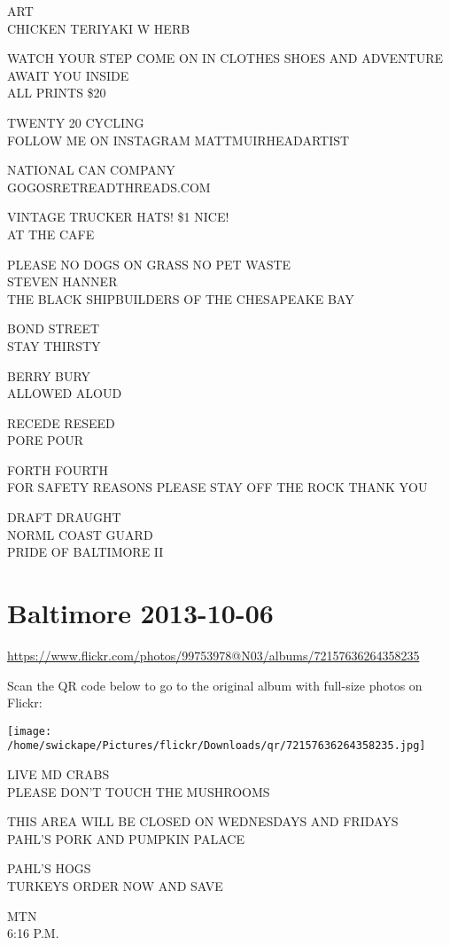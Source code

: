 \documentclass[10pt,letterpaper]{article}
\begin{document}
ART\\
CHICKEN TERIYAKI W HERB

WATCH YOUR STEP COME ON IN CLOTHES SHOES AND ADVENTURE AWAIT YOU INSIDE\\
ALL PRINTS \$20

TWENTY 20 CYCLING\\
FOLLOW ME ON INSTAGRAM MATTMUIRHEADARTIST

NATIONAL CAN COMPANY\\
GOGOSRETREADTHREADS.COM

VINTAGE TRUCKER HATS! \$1 NICE!\\
AT THE CAFE

PLEASE NO DOGS ON GRASS NO PET WASTE\\
STEVEN HANNER\\
THE BLACK SHIPBUILDERS OF THE CHESAPEAKE BAY

BOND STREET\\
STAY THIRSTY

BERRY BURY\\
ALLOWED ALOUD

RECEDE RESEED\\
PORE POUR

FORTH FOURTH\\
FOR SAFETY REASONS PLEASE STAY OFF THE ROCK THANK YOU

DRAFT DRAUGHT\\
NORML COAST GUARD\\
PRIDE OF BALTIMORE II


\section*{Baltimore 2013-10-06}

\url{https://www.flickr.com/photos/99753978@N03/albums/72157636264358235}

Scan the QR code below to go to the original album with full-size photos on Flickr:

\texttt{[image: /home/swickape/Pictures/flickr/Downloads/qr/72157636264358235.jpg]}


LIVE MD CRABS\\
PLEASE DON'T TOUCH THE MUSHROOMS

THIS AREA WILL BE CLOSED ON WEDNESDAYS AND FRIDAYS\\
PAHL'S PORK AND PUMPKIN PALACE

PAHL'S HOGS\\
TURKEYS ORDER NOW AND SAVE

MTN\\
6:16 P.M.
\end{document}
